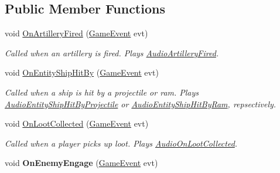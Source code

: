 \subsection*{Public Member Functions}
\begin{DoxyCompactItemize}
\item 
void \hyperlink{class_skyrates_1_1_client_1_1_audio_dispatcher_a3f32fc26138cfdd53c00b9c5f7e46e4f}{On\-Artillery\-Fired} (\hyperlink{class_skyrates_1_1_client_1_1_game_1_1_event_1_1_game_event}{Game\-Event} evt)
\begin{DoxyCompactList}\small\item\em Called when an artillery is fired. Plays \hyperlink{class_skyrates_1_1_client_1_1_audio_dispatcher_ad996cff373d93efc72d30948bf5a30d7}{Audio\-Artillery\-Fired}. \end{DoxyCompactList}\item 
void \hyperlink{class_skyrates_1_1_client_1_1_audio_dispatcher_a1edd4fbe4c6b030ba5f8c92ec9d46a9b}{On\-Entity\-Ship\-Hit\-By} (\hyperlink{class_skyrates_1_1_client_1_1_game_1_1_event_1_1_game_event}{Game\-Event} evt)
\begin{DoxyCompactList}\small\item\em Called when a ship is hit by a projectile or ram. Plays \hyperlink{class_skyrates_1_1_client_1_1_audio_dispatcher_a3bcd016090038e5f09c8735ad5cba131}{Audio\-Entity\-Ship\-Hit\-By\-Projectile} or \hyperlink{class_skyrates_1_1_client_1_1_audio_dispatcher_a67abfa1ba1df41fd20457865b10b9a4a}{Audio\-Entity\-Ship\-Hit\-By\-Ram}, repsectively. \end{DoxyCompactList}\item 
void \hyperlink{class_skyrates_1_1_client_1_1_audio_dispatcher_a47b292fd5211fd4187a687e683b504b6}{On\-Loot\-Collected} (\hyperlink{class_skyrates_1_1_client_1_1_game_1_1_event_1_1_game_event}{Game\-Event} evt)
\begin{DoxyCompactList}\small\item\em Called when a player picks up loot. Plays \hyperlink{class_skyrates_1_1_client_1_1_audio_dispatcher_ab8a146c252b56f67a02579b6b65bc299}{Audio\-On\-Loot\-Collected}. \end{DoxyCompactList}\item 
\hypertarget{class_skyrates_1_1_client_1_1_audio_dispatcher_a79c4be3f451f8f8c587c6daa8cfcfbde}{void {\bfseries On\-Enemy\-Engage} (\hyperlink{class_skyrates_1_1_client_1_1_game_1_1_event_1_1_game_event}{Game\-Event} evt)}\label{class_skyrates_1_1_client_1_1_audio_dispatcher_a79c4be3f451f8f8c587c6daa8cfcfbde}

\end{DoxyCompactItemize}
